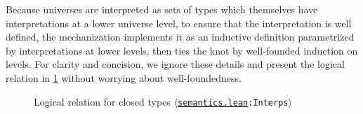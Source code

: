 \documentclass[a4paper,UKenglish,cleveref,autoref,thm-restate]{lipics-v2021}
\newcommand{\repo}{https://github.com/ionathanch/TTBFL}
\newcommand{\thmref}[2]{%
  $\langle$\href{\repo/tree/main/src/#1}{\texttt{#1}}\texttt{:#2}$\rangle$%
}
\begin{document}
Because universes are interpreted as sets of types
which themselves have interpretations at a lower universe level,
to ensure that the interpretation is well defined,
the mechanization implements it as an inductive definition
parametrized by interpretations at lower levels,
then ties the knot by well-founded induction on levels.
For clarity and concision, we ignore these details
and present the logical relation in \cref{fig:lr:closed}
without worrying about well-foundedness.

\begin{figure}
\caption{Logical relation for closed types \thmref{semantics.lean}{Interps}}
\label{fig:lr:closed}
\end{figure}
\end{document}
